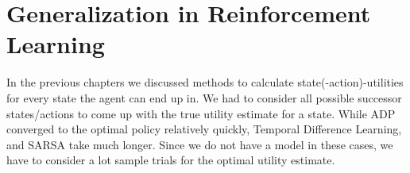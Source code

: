\documentclass{llncs}
\begin{document}

\section{Generalization in Reinforcement Learning}

In the previous chapters we discussed methods to calculate state(-action)-utilities for every state the agent can end up in. We had to consider all possible successor states/actions to come up with the true utility estimate for a state. While ADP converged to the optimal policy relatively quickly, Temporal Difference Learning, and SARSA take much longer. Since we do not have a model in these cases, we have to consider a lot sample trials for the optimal utility estimate.\par
\end{document}
